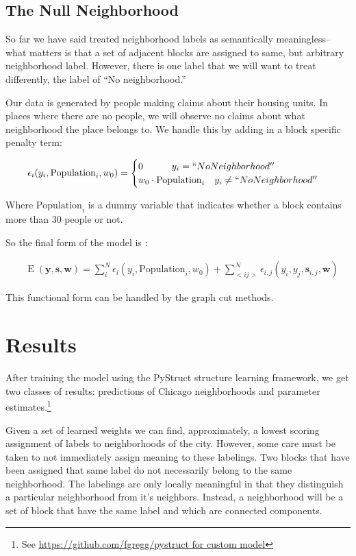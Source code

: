 \documentclass[12pt,letter]{article}\usepackage[]{graphicx}\usepackage[]{color}
\begin{document}
\subsection*{The Null Neighborhood}
So far we have said treated neighborhood labels as semantically
meaningless--what matters is that a set of adjacent blocks are
assigned to same, but arbitrary neighborhood label. However, there is
one label that we will want to treat differently, the label of ``No
neighborhood.'' 

Our data is generated by people making claims about
their housing units. In places where there are no people, we
will observe no claims about what neighborhood the place belongs
to. We handle this by adding in a block specific penalty term:

\begin{align}
\epsilon_{i}(y_i, \text{Population}_i, w_0) = \begin{cases}
    0 \quad\quad\quad y_i = ``No Neighborhood'' \\
    w_0\cdot\text{Population}_i \quad y_i \neq ``No Neighborhood'' \\
  \end{cases}
\end{align}

Where $\text{Population}_i$ is a dummy variable that indicates whether
a block contains more than 30 people or not.

So the final form of the model is :

\begin{align}
&\operatorname{E}(\mathbf{y}, \mathbf{s}, \mathbf{w}) =
  \sum_i^N\epsilon_{i}(y_i, \text{Population}_i, w_0) + \sum_{<i
    j>}^{\mathcal{N}}\epsilon_{i,j}(y_i, y_j, \mathbf{s}_{i,j}, \mathbf{w})  
\end{align}

This functional form can be handled by the graph cut methods.

\section*{Results}
After training the model using the PyStruct structure learning
framework,\cite{mueller_pystruct:_????} we get two classes of results:
predictions of Chicago neighborhoods and parameter estimates.\footnote{See \url{https://github.com/fgregg/pystruct for custom model}}

Given a set of learned weights we can find, approximately, a lowest
scoring assignment of labels to neighborhoods of the city. However,
some care must be taken to not immediately assign meaning to these
labelings. Two blocks that have been assigned that same label do not
necessarily belong to the same neighborhood. The labelings are only
locally meaningful in that they distinguish a particular neighborhood
from it’s neighbors. Instead, a neighborhood will be a set of block
that have the same label and which are connected components.  
\end{document}
